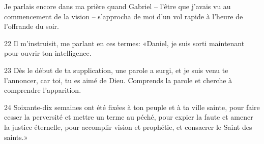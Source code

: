 Je parlais encore dans ma prière quand Gabriel – l’être que j’avais vu au commencement de la vision – s’approcha de moi d’un vol rapide à l’heure de l’offrande du soir.

22 Il m’instruisit, me parlant en ces termes: «Daniel, je suis sorti maintenant pour ouvrir ton intelligence.

23 Dès le début de ta supplication, une parole a surgi, et je suis venu te l’annoncer, car toi, tu es aimé de Dieu. Comprends la parole et cherche à comprendre l’apparition.

24 Soixante-dix semaines ont été fixées à ton peuple et à ta ville sainte, pour faire cesser la perversité et mettre un terme au péché, pour expier la faute et amener la justice éternelle, pour accomplir vision et prophétie, et consacrer le Saint des saints.»
